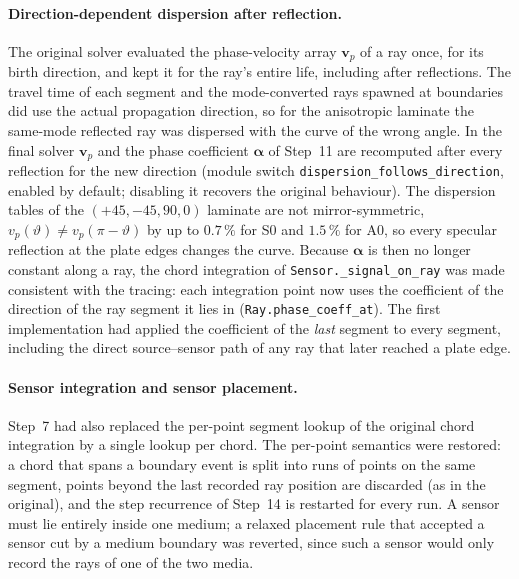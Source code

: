             \paragraph*{Direction-dependent dispersion after reflection.}
            The original solver evaluated the phase-velocity array $\mathbf{v}_p$ of a ray once, for its birth direction, and kept it for the ray's entire life, including after reflections. The travel time of each segment and the mode-converted rays spawned at boundaries did use the actual propagation direction, so for the anisotropic laminate the same-mode reflected ray was dispersed with the curve of the wrong angle. In the final solver $\mathbf{v}_p$ and the phase coefficient $\boldsymbol{\alpha}$ of Step~11 are recomputed after every reflection for the new direction (module switch \texttt{dispersion\_follows\_direction}, enabled by default; disabling it recovers the original behaviour). The dispersion tables of the $(+45, -45, 90, 0)$ laminate are not mirror-symmetric, $v_p(\vartheta) \neq v_p(\pi - \vartheta)$ by up to $0.7\,\%$ for S0 and $1.5\,\%$ for A0, so every specular reflection at the plate edges changes the curve. Because $\boldsymbol{\alpha}$ is then no longer constant along a ray, the chord integration of \texttt{Sensor.\_signal\_on\_ray} was made consistent with the tracing: each integration point now uses the coefficient of the direction of the ray segment it lies in (\texttt{Ray.phase\_coeff\_at}). The first implementation had applied the coefficient of the \emph{last} segment to every segment, including the direct source--sensor path of any ray that later reached a plate edge.

            \paragraph*{Sensor integration and sensor placement.}
            Step~7 had also replaced the per-point segment lookup of the original chord integration by a single lookup per chord. The per-point semantics were restored: a chord that spans a boundary event is split into runs of points on the same segment, points beyond the last recorded ray position are discarded (as in the original), and the step recurrence of Step~14 is restarted for every run. A sensor must lie entirely inside one medium; a relaxed placement rule that accepted a sensor cut by a medium boundary was reverted, since such a sensor would only record the rays of one of the two media.

